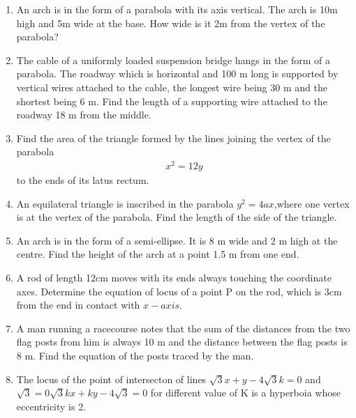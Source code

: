 \begin{enumerate}[label=\thesubsection.\arabic*,ref=\thesubsection.\theenumi]
\item An arch is in the form of a parabola with its axis vertical. The arch is 10m high and 5m wide at the base. How wide is it 2m from the vertex of the parabola?
\label{chapters/11/11/5/2}
%
\item  The cable of a uniformly loaded suspension bridge hangs in the form of a parabola. The roadway which is horizontal and 100 m long is supported by vertical wires attached to the cable, the longest wire being 30 m and the shortest being 6 m. Find the length of a supporting wire attached to the roadway 18 m from the middle.
\label{chapters/11/11/5/3}
\\
\solution
%
    \item Find the area of the triangle formed by the lines joining the vertex 
    of the parabola 
    \begin{align}
        x^2 = 12y
        \label{eq:chapters/11/11/5/6/parabola}
    \end{align}
    to the ends of its latus rectum.
\label{chapters/11/11/5/6}
%
\item An equilateral triangle is inscribed in the parabola $y^{2} = 4ax$,where one vertex is at the vertex of the parabola. Find the length of the side of the triangle.
\label{chapters/11/11/5/8}
%
\item An arch is in the form of a semi-ellipse. It is 8 m wide and 2 m high at the centre. Find the height of the arch at a point 1.5 m from one end.
\label{chapters/11/11/5/4}
%
\item A rod of length 12cm moves with its ends always touching the coordinate axes. Determine the equation of locus of a point  P on the rod, which is 3cm from the end in contact with $x-axis$.
\label{chapters/11/11/5/5}
%
\item A man running a racecourse notes that the sum of the distances from the two flag posts from him is always 10 m and the distance between the flag posts is 8 m. Find the equation of the posts traced by the man. 
\label{chapters/11/11/5/7}
%
\item The locus of the point of intersecton of lines $\sqrt{3}x+y-4\sqrt{3}k=0$ and $\sqrt{3}=0\sqrt{3}kx+ky-4\sqrt{3}=0$ for different value of K is a hyperboia whose eccentricity is 2.

\end{enumerate}

